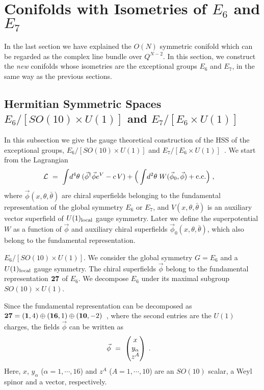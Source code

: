 \documentclass[a4paper,11pt]{article}
\newcommand{\ul}{\underline}
\begin{document}
{%

\section{Conifolds with Isometries of $E_6$ and $E_7$} \label{LE}

In the last section 
we have explained the $O(N)$ symmetric conifold which can be 
regarded as the complex line bundle over $Q^{N-2}$. 
In this section, 
we construct the {\it new} conifolds whose isometries are
the exceptional groups $E_6$ and $E_7$, 
in the same way as the previous sections. 


\subsection{Hermitian Symmetric Spaces $E_6/[SO(10)\times U(1)]$ 
and $E_7/[E_6\times U(1)]$}

In this subsection
we give the gauge theoretical construction of 
the HSS of the exceptional groups, 
$E_6/[SO(10) \times U(1)]$ and
$E_7 / [E_6 \times U(1)]$~\cite{HN1}.
We start from the Lagrangian
\begin{align}
{\cal L} 
\ &= \ 
\int \! d^4 \theta \; 
(\vec{\phi}^{\dagger} \vec{\phi} e^V - c \, V ) 
+ \Big( \int \! d^2 \theta \; W (\vec{\phi}_0, \vec{\phi}) 
+ \mbox{c.c.} \Big) \; , \label{Lagrangian-E}
\end{align}
where $\vec{\phi} (x, \theta, \bar{\theta})$ are 
chiral superfields belonging to the fundamental
representation of the global symmetry $E_6$ or $E_7$, 
and  $V (x, \theta, \bar{\theta})$ is an auxiliary
vector superfield of $U(1)_{\rm local}$ gauge symmetry.
Later we define the superpotential $W$ as a function of    
$\vec{\phi}$ and auxiliary chiral superfields  
$\vec{\phi}_0 (x, \theta, \bar{\theta})$, which also belong to 
the fundamental representation. 

\ul{\sl $E_6 / [SO(10) \times U(1)]$}. \hfil\break
We consider the global symmetry 
$G = E_6$ and a $U(1)_{\rm local}$ gauge symmetry.
The chiral superfields $\vec{\phi}$ belong to the fundamental 
representation ${\bf 27}$ of $E_6$.
We decompose $E_6$ under 
its maximal subgroup $SO(10) \times U(1)$.  

Since the fundamental representation can be decomposed as 
${\bf 27} = ({\bf 1},4) \oplus ({\bf 16},1) 
\oplus ({\bf 10},-2)$~\cite{Sl}, where the second entries 
are the $U(1)$ charges, 
the fields $\vec{\phi}$ can be written as
\begin{align}
\vec{\phi} \ &= \ \begin{pmatrix}
x \cr
y_{\alpha} \cr
z^A
\end{pmatrix} \; .\label{decom.E6}
\end{align}
Here, $x$, $y_{\alpha}$ ($\alpha=1,\cdots,16$) and 
$z^A$ ($A=1,\cdots,10$) are an $SO(10)$ scalar, 
a Weyl spinor and a vector, respectively.  

}
\end{document}
